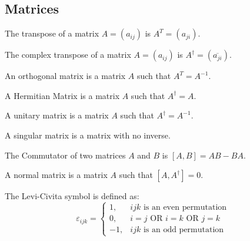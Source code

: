             \subsection{Matrices}
            \begin{definition}
            The transpose of a matrix $A = (a_{ij})$ is $A^{T} = (a_{ji})$.
            \end{definition}
            \begin{definition}
            The complex transpose of a matrix $A = (a_{ij})$ is $A^{\dagger} = (\overline{a_{ji}})$.
            \end{definition}
            \begin{definition}
            An orthogonal matrix is a matrix $A$ such that $A^T = A^{-1}$.
            \end{definition}
            \begin{definition}
            A Hermitian Matrix is a matrix $A$ such that $A^{\dagger} = A$.
            \end{definition}
            \begin{definition}
            A unitary matrix is a matrix $A$ such that $A^{\dagger} = A^{-1}$.
            \end{definition}
            \begin{definition}
            A singular matrix is a matrix with no inverse.
            \end{definition}
            \begin{definition}
            The Commutator of two matrices $A$ and $B$ is $[A,B] = AB - BA$.
            \end{definition}
            \begin{definition}
            A normal matrix is a matrix $A$ such that $[A,A^{\dagger}] = 0$.
            \end{definition}
            \begin{definition}
            The Levi-Civita symbol is defined as:
            \begin{equation*}
                \varepsilon_{ijk} = \begin{cases} 1, & ijk\textrm{ is an even permutation} \\ 0, & i=j\textrm{ OR }i=k\textrm{ OR }j=k\\ -1, & ijk\textrm{ is an odd permutation}\end{cases}
            \end{equation*}
            \end{definition}
